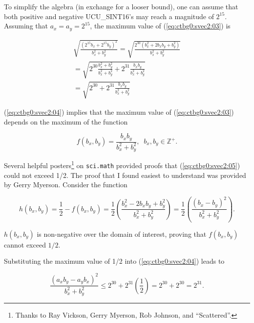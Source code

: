 To simplify the algebra (in exchange for a looser bound),
one can assume that both positive and negative
UCU\_SINT16's may reach a magnitude of $2^{15}$.  Assuming
that $a_x = a_y = 2^{15}$, the maximum value of
(\ref{eq:ctbg0:svec2:03}) is

\begin{eqnarray}
\nonumber
& 
  \displaystyle{
  \sqrt{\frac{(2^{15} b_x + 2^{15} b_y)^2}{b_x^2 + b_y^2}}
  =
  \sqrt{\frac{2^{30}(b_x^2 + 2 b_x b_y + b_y^2)}{b_x^2 + b_y^2}}
  }
& \\
\label{eq:ctbg0:svec2:04}
& 
  \displaystyle{
  = \sqrt{2^{30} \frac{b_x^2 + b_y^2}{b_x^2 + b_y^2} + 2^{31} \frac{b_x b_y}{b_x^2 + b_y^2}}
  }
& \\
\nonumber
& 
  \displaystyle{
  = \sqrt{2^{30} + 2^{31} \frac{b_x b_y}{b_x^2 + b_y^2}}
  }
&
\end{eqnarray}

(\ref{eq:ctbg0:svec2:04}) implies that the maximum value of (\ref{eq:ctbg0:svec2:03})
depends on the maximum of the function

\begin{equation}
\label{eq:ctbg0:svec2:05}
f(b_x, b_y) = \frac{b_x b_y}{b_x^2 + b_y^2} , \;\; b_x, b_y \in \mathbb{Z}^+ .
\end{equation}

Several helpful posters\footnote{Thanks to Ray Vickson, Gerry Myerson, Rob Johnson, and ``Scattered''.} 
on \texttt{sci.math} provided proofs that
(\ref{eq:ctbg0:svec2:05}) could not exceed 1/2.  The proof that I found easiest to understand 
was provided by Gerry Myerson.  Consider the function

\begin{equation}
\label{eq:ctbg0:svec2:06}
h(b_x, b_y)
= 
\frac{1}{2} - f(b_x, b_y)
= 
\frac{1}{2} \left( \frac{b_x^2 - 2 b_x b_y + b_y^2}{b_x^2 + b_y^2} \right)
= 
\frac{1}{2} \left( \frac{(b_x - b_y)^2}{b_x^2 + b_y^2} \right).
\end{equation}

$h(b_x, b_y)$ is non-negative over the domain of interest, proving that $f(b_x, b_y)$ cannot exceed $1/2$.

Substituting the maximum value of 1/2 into (\ref{eq:ctbg0:svec2:04})
leads to

\begin{equation}
\label{eq:ctbg0:svec2:07}
\frac{(a_x b_y - a_y b_x)^2}{b_x^2 + b_y^2} 
\leq 
2^{30} + 2^{31} \left( \frac{1}{2} \right)
=
2^{30} + 2^{30}
=
2^{31} .
\end{equation}

